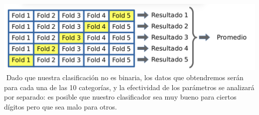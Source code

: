 {\centering
    \includegraphics[scale=0.30]{informe/imagenes/kfold/kfoldEjemplo2.png} \\
}
$ $\newline
Dado que nuestra clasificación no es binaria, los datos que obtendremos serán para cada una de las 10 categorías, y la efectividad de los parámetros se analizará por separado: es posible que nuestro clasificador sea muy bueno para ciertos dígitos pero que sea malo para otros. \\



